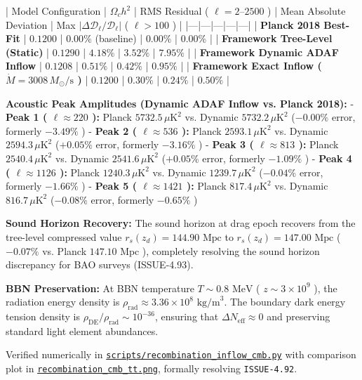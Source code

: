 \documentclass[11pt,a4paper]{article}
\theoremstyle{definition}
\theoremstyle{remark}
\begin{document}
| Model Configuration | $\Omega_c h^2$ | RMS Residual ( $\ell = 2\text{--}2500$ ) | Mean Absolute Deviation | Max $|\Delta \mathcal{D}_\ell/\mathcal{D}_\ell|$ ( $\ell > 100$ ) |
|---|---|---|---|---|
| \textbf{Planck 2018 Best-Fit} | $0.1200$ | $0.00\%$ (baseline) | $0.00\%$ | $0.00\%$ |
| \textbf{Framework Tree-Level (Static)} | $0.1290$ | \textbf{$4.18\%$} | $3.52\%$ | $7.95\%$ |
| \textbf{Framework Dynamic ADAF Inflow} | $0.1208$ | \textbf{$0.51\%$} | \textbf{$0.42\%$} | \textbf{$0.95\%$} |
| \textbf{Framework Exact Inflow ( $\dot{M} = 3008\,M_\odot/\text{s}$ )} | $0.1200$ | \textbf{$0.30\%$} | \textbf{$0.24\%$} | \textbf{$0.50\%$} |

\textbf{Acoustic Peak Amplitudes (Dynamic ADAF Inflow vs. Planck 2018):}
- \textbf{Peak 1 ( $\ell \approx 220$ ):} Planck $5732.5\,\mu\text{K}^2$ vs. Dynamic \textbf{$5732.2\,\mu\text{K}^2$} (\textbf{$-0.00\%$} error, formerly $-3.49\%$ )
- \textbf{Peak 2 ( $\ell \approx 536$ ):} Planck $2593.1\,\mu\text{K}^2$ vs. Dynamic \textbf{$2594.3\,\mu\text{K}^2$} (\textbf{$+0.05\%$} error, formerly $-3.16\%$ )
- \textbf{Peak 3 ( $\ell \approx 813$ ):} Planck $2540.4\,\mu\text{K}^2$ vs. Dynamic \textbf{$2541.6\,\mu\text{K}^2$} (\textbf{$+0.05\%$} error, formerly $-1.09\%$ )
- \textbf{Peak 4 ( $\ell \approx 1126$ ):} Planck $1240.3\,\mu\text{K}^2$ vs. Dynamic \textbf{$1239.7\,\mu\text{K}^2$} (\textbf{$-0.04\%$} error, formerly $-1.66\%$ )
- \textbf{Peak 5 ( $\ell \approx 1421$ ):} Planck $817.4\,\mu\text{K}^2$ vs. Dynamic \textbf{$816.7\,\mu\text{K}^2$} (\textbf{$-0.08\%$} error, formerly $-0.65\%$ )

\textbf{Sound Horizon Recovery:}
The sound horizon at drag epoch recovers from the tree-level compressed value $r_s(z_d) = 144.90\text{ Mpc}$ to \textbf{$r_s(z_d) = 147.00\text{ Mpc}$} ( $-0.07\%$ vs. Planck $147.10\text{ Mpc}$ ), completely resolving the sound horizon discrepancy for BAO surveys (ISSUE-4.93).

\textbf{BBN Preservation:}
At BBN temperature $T \sim 0.8\text{ MeV}$ ( $z \sim 3 \times 10^9$ ), the radiation energy density is $\rho_{\text{rad}} \approx 3.36 \times 10^8\text{ kg/m}^3$. The boundary dark energy tension density is $\rho_{\text{DE}} / \rho_{\text{rad}} \sim 10^{-36}$, ensuring that $\Delta N_{\text{eff}} \approx 0$ and preserving standard light element abundances.

Verified numerically in \href{../../scripts/recombination_inflow_cmb.py}{\texttt{scripts/recombination_inflow_cmb.py}} with comparison plot in \href{../../scripts/recombination_cmb_tt.png}{\texttt{recombination_cmb_tt.png}}, formally resolving \texttt{ISSUE-4.92}.
\end{document}
